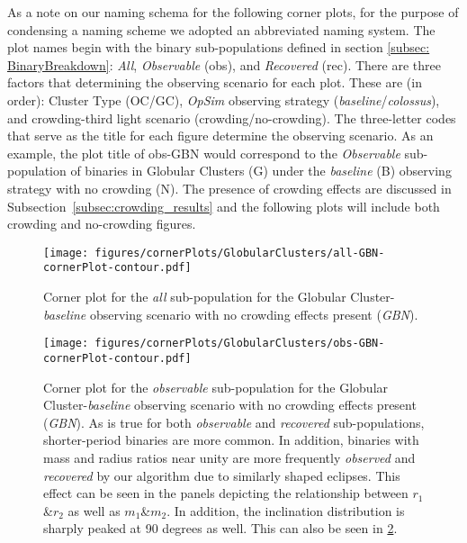 \documentclass[twocolumn]{aastex63}
\begin{document}

As a note on our naming schema for the following corner plots, for the purpose of condensing a naming scheme we adopted an abbreviated naming system. The plot names begin with the binary sub-populations defined in section \ref{subsec: BinaryBreakdown}: \textit{All}, \textit{Observable} (obs), and \textit{Recovered} (rec). There are three factors that determining the observing scenario for each plot. These are (in order): Cluster Type (OC/GC), \textit{OpSim} observing strategy (\textit{baseline}/\textit{colossus}), and crowding-third light scenario (crowding/no-crowding). The three-letter codes that serve as the title for each figure determine the observing scenario. As an example, the plot title of obs-GBN would correspond to the \textit{Observable} sub-population of binaries in Globular Clusters (G) under the \textit{baseline} (B) observing strategy with no crowding (N). The presence of crowding effects are discussed in Subsection~\ref{subsec:crowding_results} and the following plots will include both crowding and no-crowding figures.\\

\begin{figure}
    \centering
    \texttt{[image: figures/cornerPlots/GlobularClusters/all-GBN-cornerPlot-contour.pdf]}
    \caption{Corner plot for the \textit{all} sub-population for the Globular Cluster-\textit{baseline} observing scenario with no crowding effects present (\textit{GBN}).}
    \label{fig:gbn-corner-plot-appendix}
\end{figure}\clearpage

\begin{figure}
    \centering
    \texttt{[image: figures/cornerPlots/GlobularClusters/obs-GBN-cornerPlot-contour.pdf]}
    \caption{Corner plot for the \textit{observable} sub-population for the Globular Cluster-\textit{baseline} observing scenario with no crowding effects present (\textit{GBN}). As is true for both \textit{observable} and \textit{recovered} sub-populations, shorter-period binaries are more common. In addition, binaries with mass and radius ratios near unity are more frequently \textit{observed} and \textit{recovered} by our algorithm due to similarly shaped eclipses. This effect can be seen in the panels depicting the relationship between $r_1$\&$r_2$ as well as $m_1$\&$m_2$. In addition, the inclination distribution is sharply peaked at 90 degrees as well. This can also be seen in \ref{fig:gbn-corner-plot-appendix}.}
    \label{fig:gbn-corner-plot-appendix}
\end{figure}\clearpage
\end{document}
